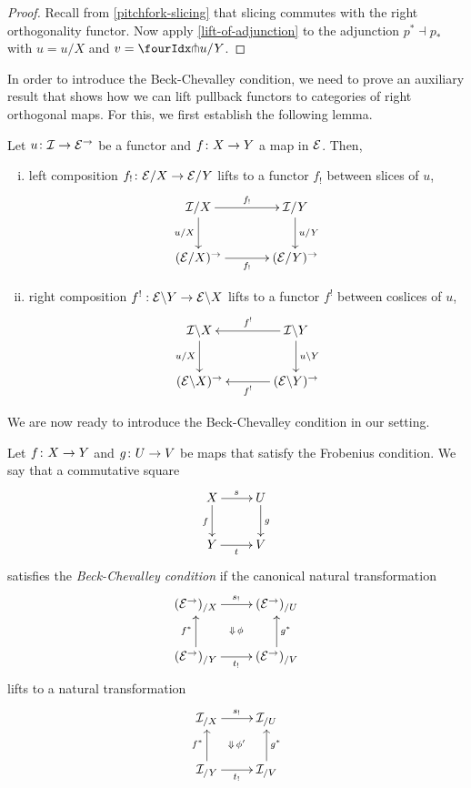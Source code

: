 \documentclass[reqno,10pt,a4paper,oneside,draft]{amsart}
\begin{document}
\begin{proof}
Recall from \cref{pitchfork-slicing} that slicing commutes with the right orthogonality functor.
Now apply \cref{lift-of-adjunction} to the adjunction $p^* \dashv p_*$ with $u = u/X$ and $v = \liftr{u}/Y$.
\end{proof}

In order to introduce the Beck-Chevalley condition, we need to prove an auxiliary result that shows how we can lift pullback functors to categories of right orthogonal maps.
For this, we first establish the following lemma.

\begin{lemma} \label{slicing-2-functorial}
Let $u \colon \mathcal{I} \to \mathcal{E}^\to$ be a functor and $f \colon X \to Y$ a map in $\mathcal{E}$.
Then,
\begin{enumerate}[(i)]
\item left composition $f_! \colon \mathcal{E}/X \to \mathcal{E}/Y$ lifts to a functor $f_!$ between slices of $u$,
\[
\xymatrix@C+1em{
  \cal{I}/X
  \ar[r]^-{f_!}
  \ar[d]_{u/X}
&
  \cal{I}/Y
  \ar[d]^{u/Y}
\\
  (\calE/X)^\to
  \ar[r]_-{f_!}
&
  (\calE/Y)^\to
}
\]
\item right composition $f^! : \mathcal{E} \backslash Y \to \mathcal{E} \backslash X$ lifts to a functor $f^!$ between coslices of $u$,
\[
\xymatrix@C+1em{
  \cal{I} \backslash X
  \ar[d]_{u/X}
&
  \cal{I} \backslash Y
  \ar[l]_-{f^!}
  \ar[d]^{u \backslash Y}
\\
  (\calE \backslash X)^\to
&
  (\calE \backslash Y)^\to
  \ar[l]^-{f^!}
}
\]
\end{enumerate}
\end{lemma}

We are now ready to introduce the Beck-Chevalley condition in our setting.

\begin{definition} \label{def:beck-chevalley}
Let $f \colon X \to Y$ and $g \colon U \to V$ be maps that satisfy the Frobenius condition.
We say that a commutative square
\[
\xymatrix{
  X
  \ar[d]_{f}
  \ar[r]^{s}
&
  U
  \ar[d]^{g}
\\
  Y
  \ar[r]_{t}
&
  V
}
\]
satisfies the \emph{Beck-Chevalley condition} if the canonical natural transformation
\[
\xymatrix{
  (\cal{E}^\to)_{/X}
  \ar[r]^{s_!} \ar@{}[dr]|{\Downarrow \, \phi}
&
  (\cal{E}^\to)_{/U}
\\
  (\cal{E}^\to)_{/Y}
  \ar[u]^{f^*}
  \ar[r]_{t_!}
&
  (\cal{E}^\to)_{/V}
  \ar[u]_{g^*}
}
\]
lifts to a natural transformation
\[
\xymatrix{
  \cal{I}_{/X}
  \ar[r]^{s_!}
  \ar@{}[dr]|{\Downarrow \, \phi'}
&
  \cal{I}_{/U}
\\
  \cal{I}_{/Y}
  \ar[u]^{f^*}
  \ar[r]_{t_!}
&
  \cal{I}_{/V}
  \ar[u]_{g^*}
}
\]
\end{definition}
\end{document}
